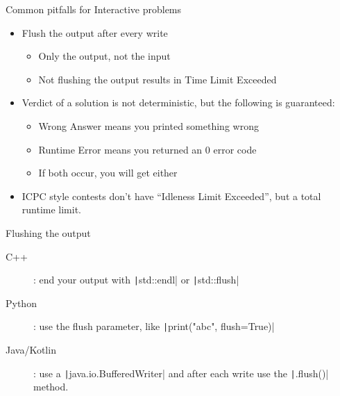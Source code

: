 \documentclass[11pt,pdf, aspectratio=169]{beamer}
\begin{document}
  \begin{frame}{Common pitfalls for Interactive problems}
    \begin{itemize}
      \item Flush the output after every write
      \begin{itemize}
        \item Only the output, not the input
        \item Not flushing the output results in Time Limit Exceeded
      \end{itemize}
      \item Verdict of a solution is not deterministic, but the following is guaranteed:
      \begin{itemize}
        \item Wrong Answer means you printed something wrong
        \item Runtime Error means you returned an 0 error code
        \item If both occur, you will get either
      \end{itemize}
      \item ICPC style contests don't have ``Idleness Limit Exceeded'', but a total runtime limit.
    \end{itemize}
  \end{frame}
  \begin{frame}{Flushing the output}
    \begin{description}
      \item [C++]: end your output with \texttt|std::endl| or \texttt|std::flush|
      \item[Python]: use the flush parameter, like \texttt|print("abc", flush=True)|
      \item[Java/Kotlin]: use a \texttt|java.io.BufferedWriter| and after each write use the \texttt|.flush()| method.
    \end{description}
  \end{frame}
\end{document}
